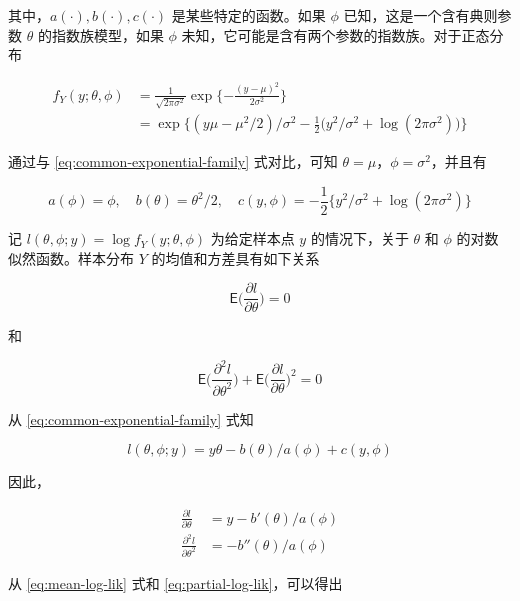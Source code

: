 \documentclass[12pt,a4paper,UTF8,twoside]{book}
\theoremstyle{definition}
\theoremstyle{definition}
\theoremstyle{definition}
\theoremstyle{remark}
\begin{document}
其中，\(a(\cdot),b(\cdot),c(\cdot)\) 是某些特定的函数。如果 \(\phi\)
已知，这是一个含有典则参数 \(\theta\) 的指数族模型，如果 \(\phi\)
未知，它可能是含有两个参数的指数族。对于正态分布

\begin{equation}
\begin{aligned}
f_{Y}(y;\theta,\phi) & = \frac{1}{\sqrt{2\pi\sigma^2}} \exp\{-\frac{(y - \mu)^2}{2\sigma^2}  \}  \\
 & = \exp\big \{ (y\mu - \mu^2/2)/\sigma^2 - \frac{1}{2}\big(y^2/\sigma^2 + \log(2\pi\sigma^2)\big) \big\}
\end{aligned} \label{eq:normal-distribution}
\end{equation}

通过与 \eqref{eq:common-exponential-family} 式对比，可知
\(\theta = \mu\)，\(\phi = \sigma^2\)，并且有

\[
a(\phi) = \phi, \quad b(\theta) = \theta^2/2, \quad c(y,\phi) = - \frac{1}{2}\{ y^2/\sigma^2 + \log(2\pi\sigma^2) \} 
\]

记 \(l(\theta,\phi;y) = \log f_{Y}(y;\theta,\phi)\) 为给定样本点 \(y\)
的情况下，关于 \(\theta\) 和 \(\phi\) 的对数似然函数。样本分布 \(Y\)
的均值和方差具有如下关系

\begin{equation}
\mathsf{E}\big( \frac{\partial l}{\partial \theta} \big) = 0
\label{eq:mean-log-lik}
\end{equation}

和

\begin{equation}
\mathsf{E}\big( \frac{\partial^2 l}{\partial \theta^2} \big) + \mathsf{E}\big(\frac{\partial l}{\partial \theta}\big)^2  = 0
\label{eq:variance-log-lik}
\end{equation}

从 \eqref{eq:common-exponential-family} 式知

\[ l(\theta,\phi;y) = {y\theta - b(\theta)}/a(\phi) + c(y,\phi) \]

因此，

\begin{equation}
\begin{aligned}
\frac{\partial l}{\partial \theta} & = {y - b'(\theta)}/a(\phi)  \\
\frac{\partial^2 l}{\partial \theta^2}  & = - b''(\theta)/a(\phi)
\end{aligned} \label{eq:partial-log-lik}
\end{equation}

从 \eqref{eq:mean-log-lik} 式和 \eqref{eq:partial-log-lik}，可以得出
\end{document}
